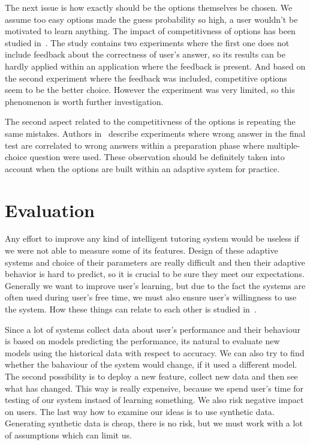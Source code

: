 \documentclass[table,color]{fithesis3/fithesis3}
\begin{document}
The next issue is how exactly should be the options themselves be chosen. We
assume too easy options made the guess probability so high, a user wouldn't be
motivated to learn anything. The impact of competitivness of options has been
studied in~\cite{little2015optimizing}. The study contains two experiments
where the first one does not include feedback about the correctness of user's
answer, so its results can be hardly applied within an application where the
feedback is present. And based on the second experiment where the feedback was
included, competitive options seem to be the better choice. However the
experiment was very limited, so this phenomenon is worth further investigation.

The second aspect related to the competitivness of the options is repeating the
same mistakes. Authors in~\cite{marsh2007memorial} describe experiments where
wrong answer in the final test are correlated to wrong answers within a
preparation phase where multiple-choice question were used. These observation
should be definitely taken into account when the options are built within an
adaptive system for practice.

\section{Evaluation}
\label{section:evaluation}

Any effort to improve any kind of intelligent tutoring system would be useless
if we were not able to measure some of its features. Design of these
adaptive systems and choice of their parameters are really difficult and then
their adaptive behavior is hard to predict, so it is crucial to be sure they
meet our expectations. Generally we want to improve user's learning, but due to
the fact the systems are often used during user's free time, we must also
ensure user's willingness to use the system. How these things can relate to each
other is studied in~\cite{lomas2013optimizing}.

Since a lot of systems collect data about user's performance and their
behaviour is based on models predicting the performance, its natural to
evaluate new models using the historical data with respect to accuracy. We can
also try to find whether the bahaviour of the system would change, if it used a
different model. The second possibility is to deploy a new feature, collect new
data and then see what has changed. This way is really expensive, because we
spend user's time for testing of our system instaed of learning something. We
also risk negative impact on users. The last way how to examine our ideas is to
use synthetic data. Generating synthetic data is cheap, there is no risk, but
we must work with a lot of assumptions which can limit us.
\end{document}
